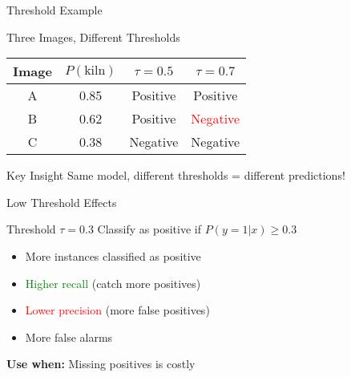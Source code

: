 \documentclass{beamer}
\begin{document}
\begin{frame}{Threshold Example}
\begin{examplebox}{Three Images, Different Thresholds}
\begin{center}
\begin{tabular}{|c|c|c|c|}
\hline
Image & $P(\text{kiln})$ & $\tau=0.5$ & $\tau=0.7$ \\
\hline
A & 0.85 & Positive & Positive \\
B & 0.62 & Positive & \textcolor{red}{Negative} \\
C & 0.38 & Negative & Negative \\
\hline
\end{tabular}
\end{center}
\end{examplebox}

\vspace{0.3cm}

\begin{keypointsbox}{Key Insight}
Same model, different thresholds = different predictions!
\end{keypointsbox}
\end{frame}

\begin{frame}{Low Threshold Effects}
\begin{block}{Threshold $\tau = 0.3$}
Classify as positive if $P(y=1|x) \geq 0.3$
\end{block}

\vspace{0.3cm}

\begin{itemize}
    \item More instances classified as positive
    \item \textcolor{green}{Higher recall} (catch more positives)
    \item \textcolor{red}{Lower precision} (more false positives)
    \item More false alarms
\end{itemize}

\vspace{0.3cm}

\begin{center}
\textbf{Use when:} Missing positives is costly
\end{center}
\end{frame}
\end{document}
